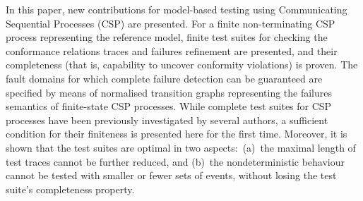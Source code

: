 In this paper, new contributions for model-based testing using Communicating
Sequential Processes (CSP) are presented. For a finite non-terminating CSP
process representing the reference model, finite test suites for checking the
conformance relations traces and failures refinement are presented, and their
completeness (that is, capability to uncover conformity violations) is
proven. The fault domains for which complete failure detection can be
guaranteed are specified by means of normalised transition graphs
representing the failures semantics of finite-state CSP processes. While
complete test suites for CSP processes have been previously investigated by
several authors, a sufficient condition for their finiteness is presented
here for the first time. Moreover, it is shown that the test suites are
optimal in two aspects:~(a)~the maximal length of test traces cannot be
further reduced, and (b)~the nondeterministic behaviour cannot be tested with
smaller or fewer sets of events, without losing the test suite's completeness
property.
